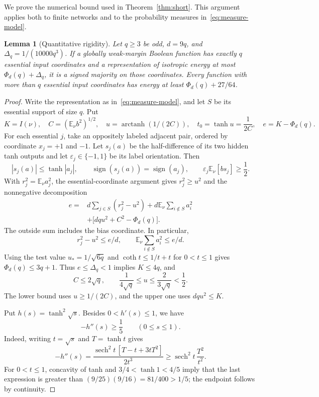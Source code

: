 \documentclass[11pt]{article}
\newtheorem{lemma}[theorem]{Lemma}
\newcommand{\E}{\mathbb E}
\newcommand{\sgn}{\operatorname{sign}}
\begin{document}
We prove the numerical bound used in Theorem~\ref{thm:short}.
This argument applies both to finite networks and to the probability
measures in~\eqref{eq:measure-model}.

\begin{lemma}[Quantitative rigidity]\label{lem:quantitative}
Let $q\ge3$ be odd, $d=9q$, and
$\Delta_q=1/(10000q^3)$. If a globally weak-margin Boolean function
has exactly $q$ essential input coordinates and a representation
of isotropic energy at most $\Phi_d(q)+\Delta_q$, it is a signed
majority on those coordinates. Every function with more than $q$
essential input coordinates has energy at least
$\Phi_d(q)+27/64$.
\end{lemma}
\begin{proof}
Write the representation as in~\eqref{eq:measure-model}, and let $S$
be its essential support of size $q$. Put
\[
 K=I(\nu),\quad C=(\E_\nu b^2)^{1/2},\quad
 u=\operatorname{arctanh}(1/(2C)),\quad t_0=\tanh u=\frac1{2C},
 \quad e=K-\Phi_d(q).
\]
For each essential $j$, take an oppositely labeled adjacent pair,
ordered by coordinate $x_j=+1$ and $-1$. Let $s_j(a)$ be the
half-difference of its two hidden tanh outputs and let
$\varepsilon_j\in\{-1,1\}$ be its label orientation. Then
\[
 |s_j(a)|\le\tanh|a_j|,\qquad
 \sgn(s_j(a))=\sgn(a_j),\qquad
 \varepsilon_j\E_\nu[bs_j]\ge\frac12.
\]
With $r_j^2=\E_\nu a_j^2$, the essential-coordinate argument gives
$r_j^2\ge u^2$ and the nonnegative decomposition
\begin{align*}
 e={}&d\sum_{j\in S}(r_j^2-u^2)
       +d\E_\nu\sum_{i\notin S}a_i^2\\
    &+\bigl[dqu^2+C^2-\Phi_d(q)\bigr].
\end{align*}
The outside sum includes the bias coordinate. In particular,
\begin{equation}\label{eq:excess-columns}
 r_j^2-u^2\le e/d,\qquad
 \E_\nu\sum_{i\notin S}a_i^2\le e/d.
\end{equation}
Using the test value $u_*=1/\sqrt{6q}$ and
$\coth t\le1/t+t$ for $0<t\le1$ gives $\Phi_d(q)\le3q+1$.
Thus $e\le\Delta_q<1$ implies $K\le4q$, and
\begin{equation}\label{eq:u-range}
 C\le2\sqrt q,\qquad
 \frac1{4\sqrt q}\le u\le\frac2{3\sqrt q}<\frac12.
\end{equation}
The lower bound uses $u\ge1/(2C)$, and the upper one uses $dqu^2\le K$.

Put $h(s)=\tanh^2\sqrt s$. Besides $0<h'(s)\le1$, we have
\begin{equation}\label{eq:h-curvature}
 -h''(s)\ge\frac15\qquad(0\le s\le1).
\end{equation}
Indeed, writing $t=\sqrt s$ and $T=\tanh t$ gives
\[
 -h''(s)
 =\frac{\operatorname{sech}^2t\,[T-t+3tT^2]}{2t^3}
 \ge\operatorname{sech}^2t\,\frac{T^2}{t^2}.
\]
For $0<t\le1$, concavity of tanh and
$3/4<\tanh1<4/5$ imply that the last expression is greater than
$(9/25)(9/16)=81/400>1/5$; the endpoint follows by continuity.


\end{proof}
\end{document}
